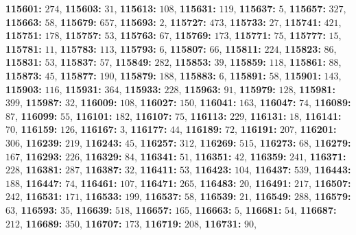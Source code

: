 \textsf{\bfseries 115601:} $274$, \textsf{\bfseries 115603:} $31$, \textsf{\bfseries 115613:} $108$, \textsf{\bfseries 115631:} $119$, \textsf{\bfseries 115637:} $5$, \textsf{\bfseries 115657:} $327$, \textsf{\bfseries 115663:} $58$, \textsf{\bfseries 115679:} $657$, \textsf{\bfseries 115693:} $2$, \textsf{\bfseries 115727:} $473$, \textsf{\bfseries 115733:} $27$, \textsf{\bfseries 115741:} $421$, \textsf{\bfseries 115751:} $178$, \textsf{\bfseries 115757:} $53$, \textsf{\bfseries 115763:} $67$, \textsf{\bfseries 115769:} $173$, \textsf{\bfseries 115771:} $75$, \textsf{\bfseries 115777:} $15$, \textsf{\bfseries 115781:} $11$, \textsf{\bfseries 115783:} $113$, \textsf{\bfseries 115793:} $6$, \textsf{\bfseries 115807:} $66$, \textsf{\bfseries 115811:} $224$, \textsf{\bfseries 115823:} $86$, \textsf{\bfseries 115831:} $53$, \textsf{\bfseries 115837:} $57$, \textsf{\bfseries 115849:} $282$, \textsf{\bfseries 115853:} $39$, \textsf{\bfseries 115859:} $118$, \textsf{\bfseries 115861:} $88$, \textsf{\bfseries 115873:} $45$, \textsf{\bfseries 115877:} $190$, \textsf{\bfseries 115879:} $188$, \textsf{\bfseries 115883:} $6$, \textsf{\bfseries 115891:} $58$, \textsf{\bfseries 115901:} $143$, \textsf{\bfseries 115903:} $116$, \textsf{\bfseries 115931:} $364$, \textsf{\bfseries 115933:} $228$, \textsf{\bfseries 115963:} $91$, \textsf{\bfseries 115979:} $128$, \textsf{\bfseries 115981:} $399$, \textsf{\bfseries 115987:} $32$, \textsf{\bfseries 116009:} $108$, \textsf{\bfseries 116027:} $150$, \textsf{\bfseries 116041:} $163$, \textsf{\bfseries 116047:} $74$, \textsf{\bfseries 116089:} $87$, \textsf{\bfseries 116099:} $55$, \textsf{\bfseries 116101:} $182$, \textsf{\bfseries 116107:} $75$, \textsf{\bfseries 116113:} $229$, \textsf{\bfseries 116131:} $18$, \textsf{\bfseries 116141:} $70$, \textsf{\bfseries 116159:} $126$, \textsf{\bfseries 116167:} $3$, \textsf{\bfseries 116177:} $44$, \textsf{\bfseries 116189:} $72$, \textsf{\bfseries 116191:} $207$, \textsf{\bfseries 116201:} $306$, \textsf{\bfseries 116239:} $219$, \textsf{\bfseries 116243:} $45$, \textsf{\bfseries 116257:} $312$, \textsf{\bfseries 116269:} $515$, \textsf{\bfseries 116273:} $68$, \textsf{\bfseries 116279:} $167$, \textsf{\bfseries 116293:} $226$, \textsf{\bfseries 116329:} $84$, \textsf{\bfseries 116341:} $51$, \textsf{\bfseries 116351:} $42$, \textsf{\bfseries 116359:} $241$, \textsf{\bfseries 116371:} $228$, \textsf{\bfseries 116381:} $287$, \textsf{\bfseries 116387:} $32$, \textsf{\bfseries 116411:} $53$, \textsf{\bfseries 116423:} $104$, \textsf{\bfseries 116437:} $539$, \textsf{\bfseries 116443:} $188$, \textsf{\bfseries 116447:} $74$, \textsf{\bfseries 116461:} $107$, \textsf{\bfseries 116471:} $265$, \textsf{\bfseries 116483:} $20$, \textsf{\bfseries 116491:} $217$, \textsf{\bfseries 116507:} $242$, \textsf{\bfseries 116531:} $171$, \textsf{\bfseries 116533:} $199$, \textsf{\bfseries 116537:} $58$, \textsf{\bfseries 116539:} $21$, \textsf{\bfseries 116549:} $288$, \textsf{\bfseries 116579:} $63$, \textsf{\bfseries 116593:} $35$, \textsf{\bfseries 116639:} $518$, \textsf{\bfseries 116657:} $165$, \textsf{\bfseries 116663:} $5$, \textsf{\bfseries 116681:} $54$, \textsf{\bfseries 116687:} $212$, \textsf{\bfseries 116689:} $350$, \textsf{\bfseries 116707:} $173$, \textsf{\bfseries 116719:} $208$, \textsf{\bfseries 116731:} $90$, 
